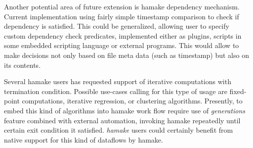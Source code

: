 \documentclass[10pt,conference,letterpaper]{IEEEtran}
\begin{document}
Another potential area of future extension is hamake dependency
mechanism. Current implementation using fairly simple timestamp
comparison to check if dependency is satisfied. This could be
generalized, allowing user to specify custom dependency check
predicates, implemented either as plugins, scripts in some embedded
scripting language or external programs. This would allow to make
decisions not only based on file meta data (such as timestamp) but
also on its contents.

Several hamake users has requested support of iterative computations
with termination condition. Possible use-cases calling for this type
of usage are fixed-point computations, iterative regression, or
clustering algorithms. Presently, to embed this kind of algorithms
into hamake work flow require use of \textit{generations} feature
combined with external automation, invoking hamake repeatedly until
certain exit condition it satisfied. \textit{hamake} users could
certainly benefit from native support for this kind of dataflows by
hamake.

\nocite{*}


\end{document}
